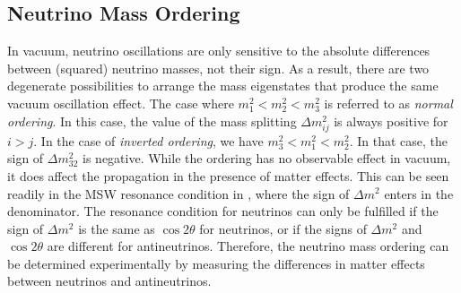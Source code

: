 \subsection{Neutrino Mass Ordering}
In vacuum, neutrino oscillations are only sensitive to the absolute differences between (squared) neutrino masses, not their sign. As a result, there are two degenerate possibilities to arrange the mass eigenstates that produce the same vacuum oscillation effect. The case where $m^2_1 < m^2_2 < m^2_3$ is referred to as \emph{normal ordering}. In this case, the value of the mass splitting $\Delta m^2_{ij}$ is always positive for $i>j$. In the case of \emph{inverted ordering}, we have $m^2_3 < m^2_1 < m^2_2$. In that case, the sign of $\Delta m^2_{32}$ is negative. While the ordering has no observable effect in vacuum, it does affect the propagation in the presence of matter effects. This can be seen readily in the MSW resonance condition in , where the sign of $\Delta m^2$ enters in the denominator. The resonance condition for neutrinos can only be fulfilled if the sign of $\Delta m^2$ is the same as $\cos 2\theta$ for neutrinos, or if the signs of $\Delta m^2$ and $\cos 2\theta$ are different for antineutrinos. Therefore, the neutrino mass ordering can be determined experimentally by measuring the differences in matter effects between neutrinos and antineutrinos.


